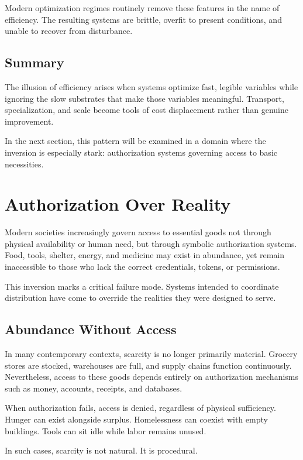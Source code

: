 \documentclass[12pt]{article} \usepackage[margin=1in]{geometry} \usepackage{setspace} \usepackage{amsmath,amssymb} \usepackage{hyperref}
\begin{document}
Modern optimization regimes routinely remove these features in the name of efficiency. The resulting systems are brittle, overfit to present conditions, and unable to recover from disturbance.


\subsection{Summary} 

The illusion of efficiency arises when systems optimize fast, legible variables while ignoring the slow substrates that make those variables meaningful. Transport, specialization, and scale become tools of cost displacement rather than genuine improvement.

In the next section, this pattern will be examined in a domain where the inversion is especially stark: authorization systems governing access to basic necessities.

\section{Authorization Over Reality}

Modern societies increasingly govern access to essential goods not through physical availability or human need, but through symbolic authorization systems. Food, tools, shelter, energy, and medicine may exist in abundance, yet remain inaccessible to those who lack the correct credentials, tokens, or permissions.

This inversion marks a critical failure mode. Systems intended to coordinate distribution have come to override the realities they were designed to serve.

\subsection{Abundance Without Access}

In many contemporary contexts, scarcity is no longer primarily material. Grocery stores are stocked, warehouses are full, and supply chains function continuously. Nevertheless, access to these goods depends entirely on authorization mechanisms such as money, accounts, receipts, and databases.

When authorization fails, access is denied, regardless of physical sufficiency. Hunger can exist alongside surplus. Homelessness can coexist with empty buildings. Tools can sit idle while labor remains unused.

In such cases, scarcity is not natural. It is procedural.
\end{document}
